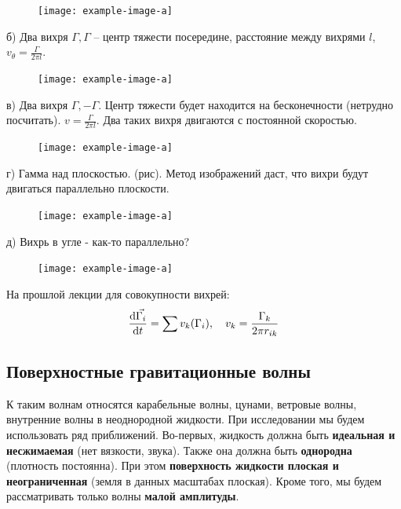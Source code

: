\begin{figure}[H]
    \centering
    \texttt{[image: example-image-a]}
    \caption{}
    \label{fig:figure1}
\end{figure}

б) Два вихря $\Gamma, \Gamma$ -- центр тяжести посередине, расстояние между вихрями $l$, $v_\theta=\frac{\Gamma}{2\pi l}$.

\begin{figure}[H]
    \centering
    \texttt{[image: example-image-a]}
    \caption{}
    \label{fig:figure1}
\end{figure}

в) Два вихря $\Gamma, -\Gamma$. Центр тяжести будет находится на бесконечности (нетрудно посчитать). $v=\frac{\Gamma}{2\pi l}$. Два таких вихря двигаются с постоянной скоростью.

\begin{figure}[H]
    \centering
    \texttt{[image: example-image-a]}
    \caption{}
    \label{fig:figure1}
\end{figure}

г) Гамма над плоскостью. (рис). Метод изображений даст, что вихри будут двигаться параллельно плоскости.

\begin{figure}[H]
    \centering
    \texttt{[image: example-image-a]}
    \caption{}
    \label{fig:figure1}
\end{figure}

д) Вихрь в угле - как-то параллельно?

\begin{figure}[H]
    \centering
    \texttt{[image: example-image-a]}
    \caption{}
    \label{fig:figure1}
\end{figure}


На прошлой лекции для совокупности вихрей:
\begin{gather}
	\label{eqga}
	\dv{\vec{\Gamma_i}}{t}=\sum v_k(\Gamma_i), \quad v_k=\frac{\Gamma_k}{2\pi r_{ik}}
\end{gather}

\subsection{Поверхностные гравитационные волны}
К таким волнам относятся карабельные волны, цунами, ветровые волны, внутренние волны в неоднородной жидкости. При исследовании мы будем использовать ряд приближений. Во-первых, жидкость должна быть \textbf{идеальная и несжимаемая} (нет вязкости, звука). Также она должна быть \textbf{однородна} (плотность постоянна). При этом \textbf{поверхность жидкости плоская и неограниченная} (земля в данных масштабах плоская). Кроме того, мы будем рассматривать только волны \textbf{малой амплитуды}.

